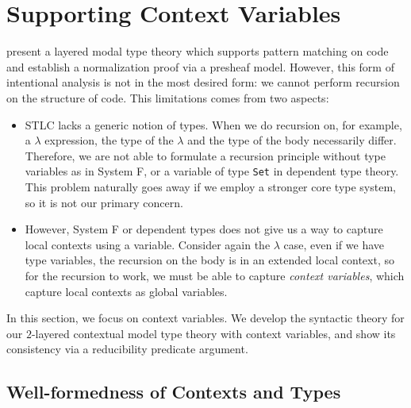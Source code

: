 \section{Supporting Context Variables}

\citet{hu2024layered} present a layered modal type theory which supports pattern
matching on code and establish a normalization proof via a presheaf model. %
However, this form of intentional analysis is not in the most desired form: we cannot
perform recursion on the structure of code. %
This limitations comes from two aspects:
\begin{itemize}
\item STLC lacks a generic notion of types. %
  When we do recursion on, for example, a $\lambda$ expression, the type of the
  $\lambda$ and the type of the body necessarily differ. %
  Therefore, we are not able to formulate a recursion principle without type variables
  as in System F, or a variable of type \texttt{Set} in dependent type theory. %
  This problem naturally goes away if we employ a stronger core type system, so it is
  not our primary concern.
  
\item However, System F or dependent types does not give us a way to capture local
  contexts using a variable. %
  Consider again the $\lambda$ case, even if we have type variables, the recursion on
  the body is in an extended local context, so for the recursion to work, we must be
  able to capture \emph{context variables}, which capture local contexts as global
  variables. 
\end{itemize}

In this section, we focus on context variables. %
We develop the syntactic theory for our $2$-layered contextual model type theory with
context variables, and show its consistency via a reducibility predicate argument. %

\subsection{Well-formedness of Contexts and Types}

